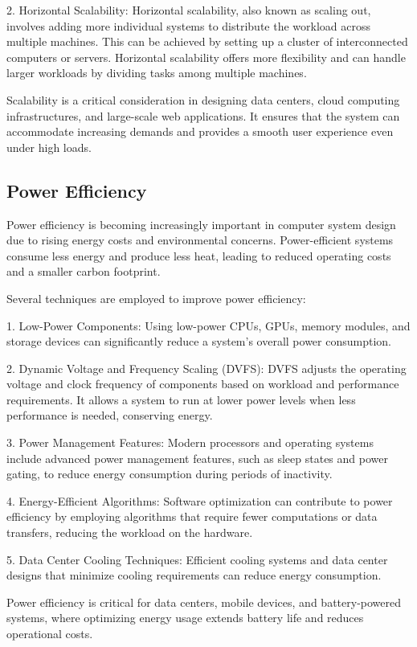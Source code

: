 \documentclass{article}
\begin{document}
2. Horizontal Scalability: Horizontal scalability, also known as scaling out, involves adding more individual systems to distribute the workload across multiple machines. This can be achieved by setting up a cluster of interconnected computers or servers. Horizontal scalability offers more flexibility and can handle larger workloads by dividing tasks among multiple machines.

Scalability is a critical consideration in designing data centers, cloud computing infrastructures, and large-scale web applications. It ensures that the system can accommodate increasing demands and provides a smooth user experience even under high loads.

\subsection{Power Efficiency}

Power efficiency is becoming increasingly important in computer system design due to rising energy costs and environmental concerns. Power-efficient systems consume less energy and produce less heat, leading to reduced operating costs and a smaller carbon footprint.

Several techniques are employed to improve power efficiency:

1. Low-Power Components: Using low-power CPUs, GPUs, memory modules, and storage devices can significantly reduce a system's overall power consumption.

2. Dynamic Voltage and Frequency Scaling (DVFS): DVFS adjusts the operating voltage and clock frequency of components based on workload and performance requirements. It allows a system to run at lower power levels when less performance is needed, conserving energy.

3. Power Management Features: Modern processors and operating systems include advanced power management features, such as sleep states and power gating, to reduce energy consumption during periods of inactivity.

4. Energy-Efficient Algorithms: Software optimization can contribute to power efficiency by employing algorithms that require fewer computations or data transfers, reducing the workload on the hardware.

5. Data Center Cooling Techniques: Efficient cooling systems and data center designs that minimize cooling requirements can reduce energy consumption.

Power efficiency is critical for data centers, mobile devices, and battery-powered systems, where optimizing energy usage extends battery life and reduces operational costs.
\end{document}

